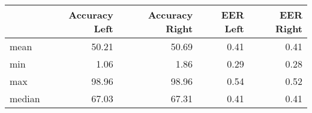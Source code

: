 \begin{tabular}{lrrrr}
\toprule
{} &  Accuracy Left &  Accuracy Right &  EER Left &  EER Right \\
\midrule
mean   &          50.21 &           50.69 &      0.41 &       0.41 \\
min    &           1.06 &            1.86 &      0.29 &       0.28 \\
max    &          98.96 &           98.96 &      0.54 &       0.52 \\
median &          67.03 &           67.31 &      0.41 &       0.41 \\
\bottomrule
\end{tabular}
